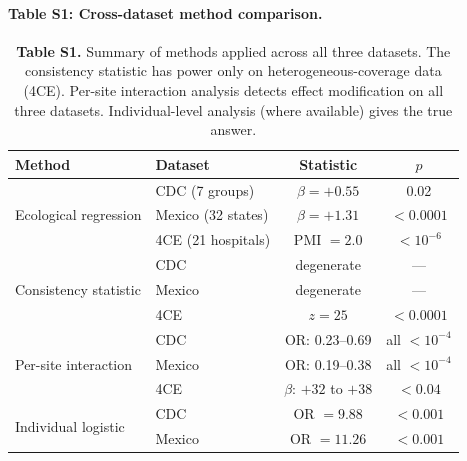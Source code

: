 \documentclass[11pt]{article}
\begin{document}
\paragraph{Table S1: Cross-dataset method comparison.}

\begin{table}[h]
\centering
\caption*{\textbf{Table S1.} Summary of methods applied across all three datasets.  The
consistency statistic has power only on heterogeneous-coverage data (4CE).
Per-site interaction analysis detects effect modification on all three
datasets.  Individual-level analysis (where available) gives the true
answer.}
\label{tab:comparison}
\begin{tabular}{llcc}
\toprule
Method & Dataset & Statistic & $p$ \\
\midrule
\multirow{3}{*}{Ecological regression}
  & CDC (7 groups) & $\beta = +0.55$ & 0.02 \\
  & Mexico (32 states) & $\beta = +1.31$ & $< 0.0001$ \\
  & 4CE (21 hospitals) & PMI $= 2.0$ & $< 10^{-6}$ \\
\midrule
\multirow{3}{*}{Consistency statistic}
  & CDC & degenerate & --- \\
  & Mexico & degenerate & --- \\
  & 4CE & $z = 25$ & $< 0.0001$ \\
\midrule
\multirow{3}{*}{Per-site interaction}
  & CDC & OR: 0.23--0.69 & all $< 10^{-4}$ \\
  & Mexico & OR: 0.19--0.38 & all $< 10^{-4}$ \\
  & 4CE & $\beta$: $+32$ to $+38$ & $< 0.04$ \\
\midrule
\multirow{2}{*}{Individual logistic}
  & CDC & OR $= 9.88$ & $< 0.001$ \\
  & Mexico & OR $= 11.26$ & $< 0.001$ \\
\bottomrule
\end{tabular}
\end{table}




\end{document}
